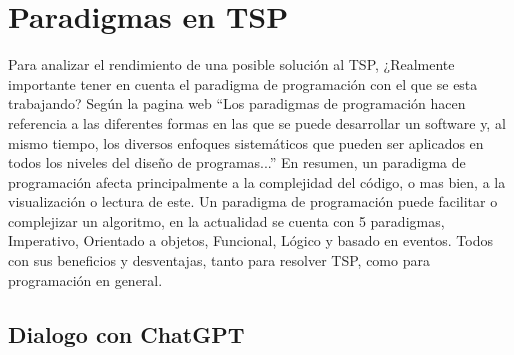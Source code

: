        \section{Paradigmas en TSP}
            Para analizar el rendimiento de una posible solución al TSP, ¿Realmente importante tener en cuenta el paradigma de programación con el que se esta trabajando? Según la pagina web \parencite{KeepCoding} “Los paradigmas de programación hacen referencia a las diferentes formas en las que se puede desarrollar un software y, al mismo tiempo, los diversos enfoques sistemáticos que pueden ser aplicados en todos los niveles del diseño de programas...” 
            \newline
            \newline
            En resumen, un paradigma de programación afecta principalmente a la complejidad del código, o mas bien, a la visualización o lectura de este. Un paradigma de programación puede facilitar o complejizar un algoritmo, en la actualidad se cuenta con 5 paradigmas, Imperativo, Orientado a objetos, Funcional, Lógico y basado en eventos. Todos con sus beneficios y desventajas, tanto para resolver TSP, como para programación en general.

                \subsection{Dialogo con ChatGPT}      

